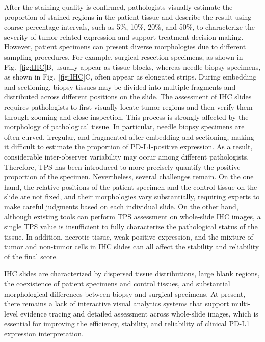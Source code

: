 \documentclass[journal]{vgtc}                     %
\begin{document}
After the staining quality is confirmed, pathologists visually estimate the proportion of stained regions in the patient tissue and describe the result using coarse percentage intervals, such as 5\%, 10\%, 20\%, and 50\%, to characterize the severity of tumor-related expression and support treatment decision-making. However, patient specimens can present diverse morphologies due to different sampling procedures. For example, surgical resection specimens, as shown in Fig.~\ref{fig:IHC}B, usually appear as tissue blocks, whereas needle biopsy specimens, as shown in Fig.~\ref{fig:IHC}C, often appear as elongated strips. During embedding and sectioning, biopsy tissues may be divided into multiple fragments and distributed across different positions on the slide. The assessment of IHC slides requires pathologists to first visually locate tumor regions and then verify them through zooming and close inspection. This process is strongly affected by the morphology of pathological tissue. In particular, needle biopsy specimens are often curved, irregular, and fragmented after embedding and sectioning, making it difficult to estimate the proportion of PD-L1-positive expression. As a result, considerable inter-observer variability may occur among different pathologists. Therefore, TPS has been introduced to more precisely quantify the positive proportion of the specimen. Nevertheless, several challenges remain. On the one hand, the relative positions of the patient specimen and the control tissue on the slide are not fixed, and their morphologies vary substantially, requiring experts to make careful judgments based on each individual slide. On the other hand, although existing tools can perform TPS assessment on whole-slide IHC images, a single TPS value is insufficient to fully characterize the pathological status of the tissue. In addition, necrotic tissue, weak positive expression, and the mixture of tumor and non-tumor cells in IHC slides can all affect the stability and reliability of the final score. 

IHC slides are characterized by dispersed tissue distributions, large blank regions, the coexistence of patient specimens and control tissues, and substantial morphological differences between biopsy and surgical specimens. At present, there remains a lack of interactive visual analytics systems that support multi-level evidence tracing and detailed assessment across whole-slide images, which is essential for improving the efficiency, stability, and reliability of clinical PD-L1 expression interpretation.
\end{document}
